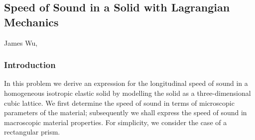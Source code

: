 \documentclass[letterpaper,12pt]{article}
\begin{document}
\begin{center}
    \subsection*{Speed of Sound in a Solid with Lagrangian Mechanics}
    James Wu, 
\end{center}

\begin{flushleft}

    \subsubsection*{Introduction}
    In this problem we derive an expression for the longitudinal speed of sound in a homogeneous isotropic elastic solid by modelling the solid as a three-dimensional cubic lattice. We first determine the speed of sound in terms of microscopic parameters of the material; subsequently we shall express the speed of sound in macroscopic material properties. For simplicity, we consider the case of a rectangular prism.


\end{flushleft}
\end{document}
